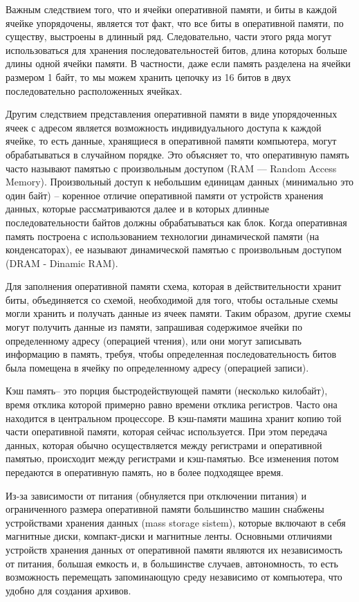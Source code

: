 \documentclass[a4paper]{article}
\begin{document}
Важным следствием того, что и ячейки оперативной памяти, и биты в каждой ячейке упорядочены, является тот факт, что все биты в оперативной памяти, по существу, выстроены в длинный ряд. Следовательно, части этого ряда могут использоваться для хранения последовательностей битов, длина которых больше длины одной ячейки памяти. В частности, даже если память разделена на ячейки размером 1 байт, то мы можем хранить цепочку из 16 битов в двух последовательно расположенных ячейках.

Другим следствием представления оперативной памяти в виде упорядоченных ячеек с адресом является возможность индивидуального доступа к каждой ячейке, то есть данные, хранящиеся в оперативной памяти компьютера, могут обрабатываться в случайном порядке. Это объясняет то, что оперативную память часто называют памятью с произвольным доступом (RAM — Random Access Memory). Произвольный доступ к небольшим единицам данных (минимально это один байт) – коренное отличие оперативной памяти от устройств хранения данных, которые рассматриваются далее и в которых длинные последовательности байтов должны обрабатываться как блок. Когда оперативная память построена с использованием технологии динамической памяти (на конденсаторах), ее называют динамической памятью с произвольным доступом (DRAM - Dinamic RAM).

Для заполнения оперативной памяти схема, которая в действительности хранит биты, объединяется со схемой, необходимой для того, чтобы остальные схемы могли хранить и получать данные из ячеек памяти. Таким образом, другие схемы могут получить данные из памяти, запрашивая содержимое ячейки по определенному адресу (операцией чтения), или они могут записывать информацию в память, требуя, чтобы определенная последовательность битов была помещена в ячейку по определенному адресу (операцией записи).

Кэш память– это порция быстродействующей памяти (несколько килобайт), время отклика которой примерно равно времени отклика регистров. Часто она находится в центральном процессоре. В кэш-памяти машина хранит копию той части оперативной памяти, которая сейчас используется. При этом передача данных, которая обычно осуществляется между регистрами и оперативной памятью, происходит между регистрами и кэш-памятью. Все изменения потом передаются в оперативную память, но в более подходящее время.

Из-за зависимости от питания (обнуляется при отключении питания) и ограниченного размера оперативной памяти большинство машин снабжены устройствами хранения данных (mass storage sistem), которые включают в себя магнитные диски, компакт-диски и магнитные ленты. Основными отличиями устройств хранения данных от оперативной памяти являются их независимость от питания, большая емкость и, в большинстве случаев, автономность, то есть возможность перемещать запоминающую среду независимо от компьютера, что удобно для создания архивов.
\end{document}
